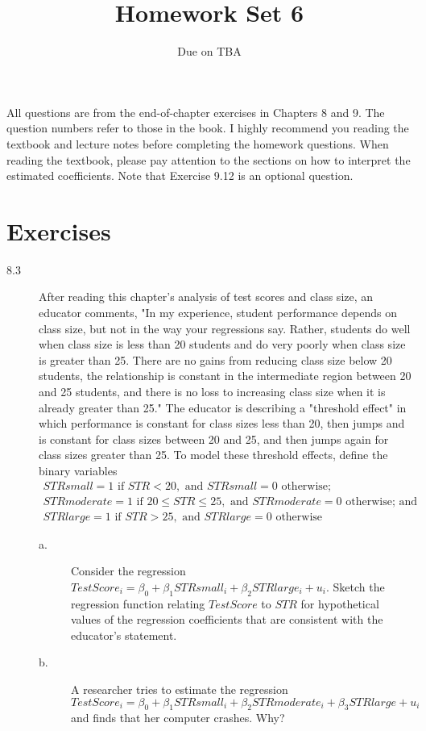 \documentclass[a4paper,11pt]{article}
\date{Due on TBA}
\title{Homework Set 6}
\begin{document}
\maketitle
All questions are from the end-of-chapter exercises in Chapters 8
and 9. The question numbers refer to those in the book. I highly
recommend you reading the textbook and lecture notes before completing
the homework questions. When reading the textbook, please pay
attention to the sections on how to interpret the estimated
coefficients. Note that Exercise 9.12 is an optional question.

\section*{Exercises}
\label{sec:org251c7c7}
\begin{description}
\item[{8.3}] After reading this chapter's analysis of test scores and class
size, an educator comments, "In my experience, student
performance depends on class size, but not in the way your
regressions say. Rather, students do well when class size is
less than 20 students and do very poorly when class size is
greater than 25. There are no gains from reducing class size
below 20 students, the relationship is constant in the
intermediate region between 20 and 25 students, and there is
no loss to increasing class size when it is already greater
than 25." The educator is describing a "threshold effect" in
which performance is constant for class sizes less than 20,
then jumps and is constant for class sizes between 20 and 25,
and then jumps again for class sizes greater than 25. To
model these threshold effects, define the binary variables
\begin{gather*}
STRsmall = 1 \text{ if } STR < 20, \text{ and } STRsmall =
0 \text{ otherwise;} \\
STRmoderate = 1 \text{ if } 20 \leq STR \leq 25, \text{ and } STRmoderate = 0 \text{ otherwise; and } \\
STRlarge = 1 \text{ if } STR > 25, \text{ and } STRlarge = 0 \text{ otherwise}
\end{gather*}
\begin{description}
\item[{a.}] Consider the regression \(TestScore_i = \beta_0 + \beta_1
          STRsmall_i + \beta_2 STRlarge_i + u_i\). Sketch the regression
function relating \(TestScore\) to \(STR\) for hypothetical values
of the regression coefficients that are consistent with the
educator's statement.
\item[{b.}] A researcher tries to estimate the regression \(TestScore_i = \beta_0 + \beta_1
          STRsmall_i + \beta_2 STRmoderate_i + \beta_3 STRlarge + u_i\)
and finds that her computer crashes. Why?
\end{description}


\end{description}
\end{document}
